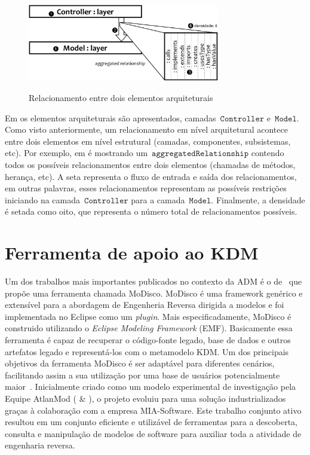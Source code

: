 \begin{figure}[!ht]
	\centering
	\caption{Relacionamento entre dois elementos arquiteturais}
	\includegraphics[width=3.3in]{images/relationshipExample1.pdf}
	\fautor
	\label{fig:relationship_example_1}
\end{figure}


Em  os elementos arquiteturais são apresentados, camadas~$\mathtt{Controller}$ e~$\mathtt{Model}$. Como visto anteriormente, um relacionamento em nível arquitetural acontece entre dois elementos em nível estrutural (camadas, componentes, subsistemas, etc). Por exemplo, em  é mostrando um~$\mathtt{aggregatedRelationship}$ contendo todos os possíveis relacionamentos  entre dois elementos (chamadas de métodos, herança, etc). A seta  representa o fluxo de entrada e saída dos relacionamentos, em outras palavras, esses relacionamentos representam as possíveis restrições iniciando na camada~$\mathtt{Controller}$  para a camada~$\mathtt{Model}$. Finalmente, a densidade  é setada como oito, que representa o número total de relacionamentos possíveis.


\section{Ferramenta de apoio ao KDM}\label{sec:Ferramenta_de_apoio_KDM_capitulo}

Um dos trabalhos mais importantes publicados no contexto da ADM é o de~ que propõe uma ferramenta chamada MoDisco. MoDisco é uma framework genérico e extensível para a abordagem de Engenheria Reversa dirigida a modelos e foi implementada no  Eclipse como um \textit{plugin}. Mais especificadamente, MoDisco é construido utilizando o \textit{Eclipse Modeling Framework} (EMF). Basicamente essa ferramenta é capaz de recuperar o código-fonte legado, base de dados e outros artefatos legado e representá-los com o metamodelo KDM. Um dos principais objetivos da ferramenta MoDisco é ser adaptável para diferentes cenários, facilitando assim a sua utilização por uma base de usuários potencialmente maior~\cite{Bruneliere_2014}. Inicialmente criado como um modelo experimental de investigação pela Equipe AtlanMod ( \& ), o projeto evoluiu para uma solução industrializados graças à colaboração com a empresa MIA-Software. Este trabalho conjunto ativo resultou em um conjunto eficiente e utilizável de ferramentas para a descoberta, consulta e manipulação de modelos de software para auxiliar toda a atividade de engenharia reversa.


